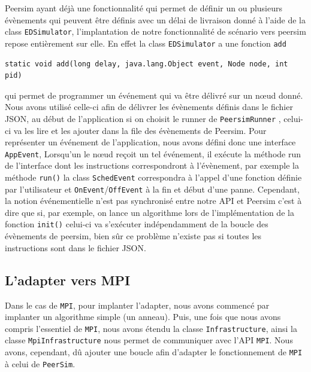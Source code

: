 \documentclass{article}
\begin{document}
						\vspace{5mm}
						Peersim ayant déjà une fonctionnalité qui permet de définir un ou plusieurs évènements qui peuvent être définis avec un délai de livraison donné à l'aide de la class \verb|EDSimulator|,
						l'implantation de notre fonctionnalité de scénario vers peersim repose entièrement sur elle.
						En effet la class \verb|EDSimulator| a une fonction \verb|add|
						\begin{lstlisting}
static void add(long delay, java.lang.Object event, Node node, int pid)
						\end{lstlisting}
						qui permet de programmer un événement qui va être délivré sur un nœud donné. 
						\newline
						Nous avons utilisé celle-ci afin de délivrer les évènements définis dans le fichier JSON, au début de l'application si on choisit le runner de \verb|PeersimRunner| , celui-ci va 
						les lire et les ajouter dans la file des évènements de Peersim.
		Pour représenter un événement de l'application, nous avons défini donc une interface \verb|AppEvent|,
						Lorsqu'un le nœud reçoit un tel événement, il exécute la méthode run de l'interface dont les instructions correspondront à l'évènement, par exemple la méthode \verb|run()| la class \verb|SchedEvent| 
						correspondra à l'appel d'une fonction définie par l'utilisateur et  \verb|OnEvent|/\verb|OffEvent| à la fin et début d'une panne.
						Cependant, la notion événementielle n'est pas synchronisé entre notre API et Peersim c'est à dire que si, par exemple, on lance un algorithme lors de l'implémentation de la fonction \verb|init()| celui-ci 
						va s'exécuter indépendamment de la boucle des évènements de peersim, bien sûr ce problème n'existe pas si toutes les instructions sont dans le fichier JSON.
			
			\newpage
			\subsection{L'adapter vers MPI}
			Dans le cas de \verb|MPI|, pour implanter l'adapter, nous avons commencé par implanter un algorithme simple (un anneau). Puis, une fois que nous avons compris l'essentiel de \verb|MPI|, nous avons étendu la classe \verb|Infrastructure|, ainsi la classe \verb|MpiInfrastructure| nous permet de communiquer avec l'API \verb|MPI|. 
			Nous avons, cependant, dû ajouter une boucle afin d'adapter le fonctionnement de \verb|MPI| à celui de \verb|PeerSim|.
\end{document}
